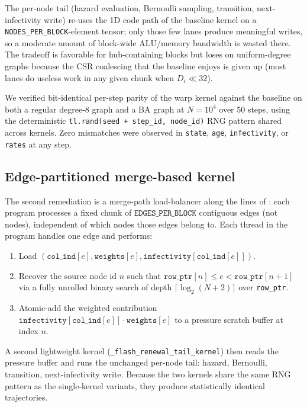 The per-node tail (hazard evaluation, Bernoulli sampling, transition, next-infectivity write) re-uses the 1D code path of the baseline kernel on a \texttt{NODES\_PER\_BLOCK}-element tensor; only those few lanes produce meaningful writes, so a moderate amount of block-wide ALU/memory bandwidth is wasted there. The tradeoff is favorable for hub-containing blocks but loses on uniform-degree graphs because the CSR coalescing that the baseline enjoys is given up (most lanes do useless work in any given chunk when $D_i \ll 32$).

We verified bit-identical per-step parity of the warp kernel against the baseline on both a regular degree-8 graph and a BA graph at $N = 10^4$ over 50 steps, using the deterministic \texttt{tl.rand(seed + step\_id, node\_id)} RNG pattern shared across kernels. Zero mismatches were observed in \texttt{state}, \texttt{age}, \texttt{infectivity}, or \texttt{rates} at any step.

\subsection{Edge-partitioned merge-based kernel}
\label{app:merge_kernel}

The second remediation is a merge-path load-balancer along the lines of \citet{merrill2016merge}: each program processes a fixed chunk of $\texttt{EDGES\_PER\_BLOCK}$ contiguous edges (not nodes), independent of which nodes those edges belong to. Each thread in the program handles one edge and performs:
\begin{enumerate}
\item Load $(\texttt{col\_ind}[e], \texttt{weights}[e], \texttt{infectivity}[\texttt{col\_ind}[e]])$.
\item Recover the source node id $n$ such that $\texttt{row\_ptr}[n] \leq e < \texttt{row\_ptr}[n+1]$ via a fully unrolled binary search of depth $\lceil \log_2(N + 2)\rceil$ over \texttt{row\_ptr}.
\item Atomic-add the weighted contribution $\texttt{infectivity}[\texttt{col\_ind}[e]] \cdot \texttt{weights}[e]$ to a pressure scratch buffer at index $n$.
\end{enumerate}
A second lightweight kernel (\texttt{\_flash\_renewal\_tail\_kernel}) then reads the pressure buffer and runs the unchanged per-node tail: hazard, Bernoulli, transition, next-infectivity write. Because the two kernels share the same RNG pattern as the single-kernel variants, they produce statistically identical trajectories.

